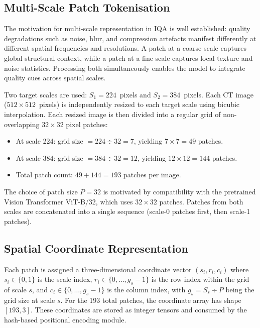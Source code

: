 \subsection{Multi-Scale Patch Tokenisation}

The motivation for multi-scale representation in IQA is well established: quality
degradations such as noise, blur, and compression artefacts manifest differently at
different spatial frequencies and resolutions. A patch at a coarse scale captures global
structural context, while a patch at a fine scale captures local texture and noise
statistics. Processing both simultaneously enables the model to integrate quality cues
across spatial scales.

Two target scales are used: $S_1 = 224$~pixels and $S_2 = 384$~pixels. Each CT image
($512 \times 512$~pixels) is independently resized to each target scale using bicubic
interpolation. Each resized image is then divided into a regular grid of non-overlapping
$32 \times 32$ pixel patches:

\begin{itemize}
    \item At scale 224: grid size $= 224 \div 32 = 7$, yielding $7 \times 7 = 49$ patches.
    \item At scale 384: grid size $= 384 \div 32 = 12$, yielding $12 \times 12 = 144$ patches.
    \item Total patch count: $49 + 144 = 193$ patches per image.
\end{itemize}

The choice of patch size $P = 32$ is motivated by compatibility with the pretrained
Vision Transformer ViT-B/32, which uses $32 \times 32$ patches. Patches from both
scales are concatenated into a single sequence (scale-0 patches first, then scale-1
patches).

\subsection{Spatial Coordinate Representation}

Each patch is assigned a three-dimensional coordinate vector $(s_i, r_i, c_i)$ where
$s_i \in \{0, 1\}$ is the scale index, $r_i \in \{0, \ldots, g_s - 1\}$ is the row
index within the grid of scale $s$, and $c_i \in \{0, \ldots, g_s - 1\}$ is the column
index, with $g_s = S_s \div P$ being the grid size at scale $s$. For the 193 total
patches, the coordinate array has shape $[193, 3]$. These coordinates are stored as
integer tensors and consumed by the hash-based positional encoding module.

